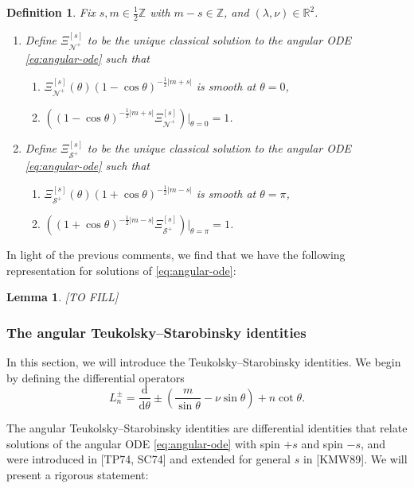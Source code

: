 \documentclass[11pt]{article}
\newtheorem{lemma}[proposition]{Lemma}
\newtheorem{definition}[proposition]{Definition}
\newcommand{\dd}{\mathrm{d}}
\newcommand{\cN}{\mathcal N}
\newcommand{\cS}{\mathcal S}
\numberwithin{equation}{section}
\begin{document}
\begin{definition}\label{def:angular-basis}
Fix $s,m\in \frac12\mathbb Z$ with $m-s\in \mathbb Z$, and $(\lambda,\nu)\in\mathbb R^2$.
\begin{enumerate}[label=\arabic*.]
\item Define $\Xi^{[s]}_{\cN^+}$ to be the unique classical solution to the angular ODE \eqref{eq:angular-ode} such that 
\begin{enumerate}[label=\roman*.]
\item $\Xi^{[s]}_{\cN^+}(\theta)(1-\cos\theta)^{-\frac12|m+s|}$ is smooth at $\theta=0$,
\item $\left((1-\cos\theta)^{-\frac12|m+s|}\Xi^{[s]}_{\cN^+}\right)\big|_{\theta=0}=1$.
\end{enumerate}
\item Define $\Xi^{[s]}_{\cS^+}$ to be the unique classical solution to the angular ODE \eqref{eq:angular-ode} such that 
\begin{enumerate}[label=\roman*.]
\item $\Xi^{[s]}_{\cS^+}(\theta)(1+\cos\theta)^{-\frac12|m-s|}$ is smooth at $\theta=\pi$,
\item $\left((1+\cos\theta)^{-\frac12|m-s|}\Xi^{[s]}_{\cS^+}\right)\big|_{\theta=\pi}=1$.
\end{enumerate}
\end{enumerate}
\end{definition}

In light of the previous comments, we find that we have the following representation for solutions of \eqref{eq:angular-ode}:

\begin{lemma}\label{lem:angular-representation}
 [TO FILL]
\end{lemma}

\subsubsection{The angular Teukolsky--Starobinsky identities}

In this section, we will introduce the Teukolsky--Starobinsky identities.  We begin by defining the differential operators
\begin{equation}\label{eq:Lpm}
        L^{\pm}_n=\frac{\dd}{\dd\theta}\pm\left(\frac{m}{\sin\theta}-\nu\sin\theta\right)+n\cot\theta.
\end{equation}

The angular Teukolsky--Starobinsky identities are differential identities that relate solutions of the  angular ODE \eqref{eq:angular-ode} with spin $+s$ and spin $-s$, and were introduced in [TP74, SC74] and extended for general $s$ in [KMW89]. We will present a rigorous statement:
\end{document}
